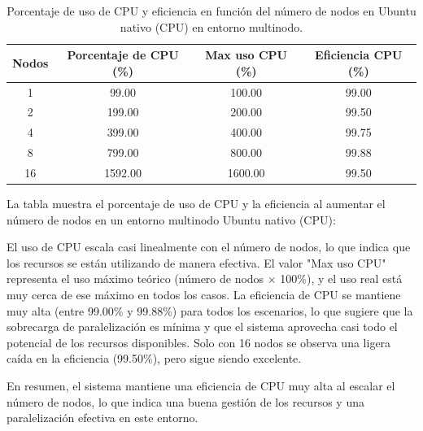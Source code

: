 \begin{table}[ht]
    \centering
    \small
    \setlength{\tabcolsep}{4pt}
    \renewcommand{\arraystretch}{1.1}
    \begin{tabular}{|c|c|c|c|}
        \hline
        \textbf{Nodos} & \textbf{Porcentaje de CPU (\%)} & \textbf{Max uso CPU (\%)} & \textbf{Eficiencia CPU (\%)} \\
        \hline
        1              & 99.00                           & 100.00                    & 99.00                        \\
        2              & 199.00                          & 200.00                    & 99.50                        \\
        4              & 399.00                          & 400.00                    & 99.75                        \\
        8              & 799.00                          & 800.00                    & 99.88                        \\
        16             & 1592.00                         & 1600.00                   & 99.50                        \\
        \hline
    \end{tabular}
    \caption{Porcentaje de uso de CPU y eficiencia en función del número de nodos en Ubuntu nativo (CPU) en entorno multinodo.}
    \label{tab:multi-node_ubuntu_cpu_native_cpu}
\end{table}

La tabla muestra el porcentaje de uso de CPU y la eficiencia al aumentar el número de nodos en un entorno multinodo Ubuntu nativo (CPU):

El uso de CPU escala casi linealmente con el número de nodos, lo que indica que los recursos se están utilizando de manera efectiva. El valor "Max uso CPU" representa el uso máximo teórico (número de nodos $\times$ 100\%), y el uso real está muy cerca de ese máximo en todos los casos. La eficiencia de CPU se mantiene muy alta (entre 99.00\% y 99.88\%) para todos los escenarios, lo que sugiere que la sobrecarga de paralelización es mínima y que el sistema aprovecha casi todo el potencial de los recursos disponibles. Solo con 16 nodos se observa una ligera caída en la eficiencia (99.50\%), pero sigue siendo excelente.

En resumen, el sistema mantiene una eficiencia de CPU muy alta al escalar el número de nodos, lo que indica una buena gestión de los recursos y una paralelización efectiva en este entorno.

